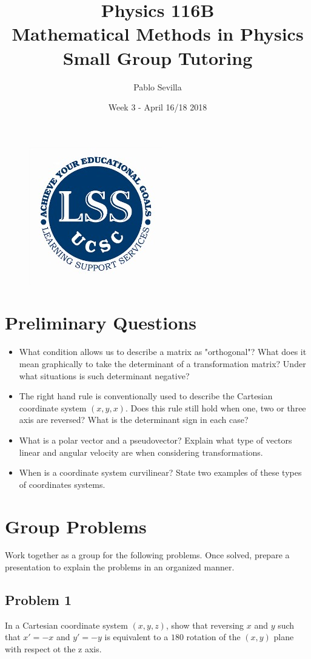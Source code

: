 \documentclass{article}
\title{Physics 116B \\ Mathematical Methods in Physics\\ Small Group Tutoring}
\author{Pablo Sevilla}
\date{Week 3 - April 16/18 2018}
\begin{document}
\maketitle

\begin{figure}[h]
\centering
\includegraphics[scale=0.3]{lss}
\end{figure}
\section{Preliminary Questions}
 \begin{itemize}
  \item What condition allows us to describe a matrix as "orthogonal"? What does it mean graphically to take the determinant of a transformation matrix? Under what situations is such determinant negative?
  \item The right hand rule is conventionally used to describe the Cartesian coordinate system $(x,y,x)$. Does this rule still hold when one, two or three axis are reversed? What is the determinant sign in each case?
  \item What is a polar vector and a pseudovector? Explain what type of vectors linear and angular velocity are when considering transformations.
  \item When is a coordinate system curvilinear? State two examples of these types of coordinates systems.
  \end{itemize}
  \section{Group Problems}
  Work together as a group for the following problems. Once solved, prepare a presentation to explain the problems in an organized manner.
  \subsection{Problem 1}
 In a Cartesian coordinate system $(x,y,z)$, show that reversing $x$ and $y$ such that $x'=-x$ and $y'=-y$ is equivalent to a $180$ rotation of the $(x,y)$ plane with respect ot the z axis.
 
\end{document}
